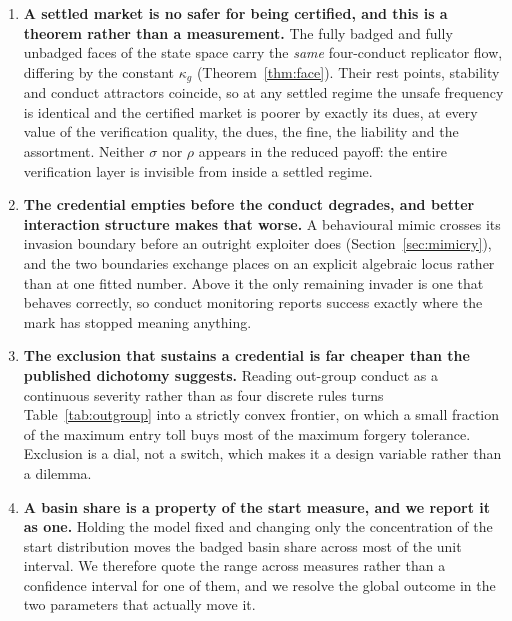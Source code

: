 \documentclass[11pt,a4paper]{article}
\theoremstyle{definition}
\begin{document}
\begin{enumerate}
\item \textbf{A settled market is no safer for being certified, and this is a
theorem rather than a measurement.} The fully badged and fully unbadged faces
of the state space carry the \emph{same} four-conduct replicator flow, differing
by the constant $\kappa_g$ (Theorem~\ref{thm:face}). Their rest points,
stability and conduct attractors coincide, so at any settled regime the unsafe
frequency is identical and the certified market is poorer by exactly its dues,
at every value of the verification quality, the dues, the fine, the liability
and the assortment. Neither $\sigma$ nor $\rho$ appears in the reduced payoff:
the entire verification layer is invisible from inside a settled regime.

\item \textbf{The credential empties before the conduct degrades, and better
interaction structure makes that worse.} A behavioural mimic crosses its
invasion boundary before an outright exploiter does
(Section~\ref{sec:mimicry}), and the two boundaries exchange places on an
explicit algebraic locus rather than at one fitted number. Above it the only
remaining invader is one that behaves correctly, so conduct monitoring reports
success exactly where the mark has stopped meaning anything.

\item \textbf{The exclusion that sustains a credential is far cheaper than the
published dichotomy suggests.} Reading out-group conduct as a continuous
severity rather than as four discrete rules turns
Table~\ref{tab:outgroup} into a strictly convex frontier, on which a small
fraction of the maximum entry toll buys most of the maximum forgery tolerance.
Exclusion is a dial, not a switch, which makes it a design variable rather than
a dilemma.

\item \textbf{A basin share is a property of the start measure, and we report
it as one.} Holding the model fixed and changing only the concentration of the
start distribution moves the badged basin share across most of the unit
interval. We therefore quote the range across measures rather than a confidence
interval for one of them, and we resolve the global outcome in the two
parameters that actually move it.
\end{enumerate}
\end{document}
